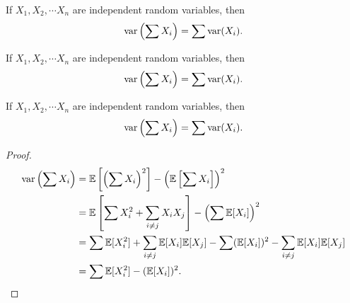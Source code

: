 \begin{note}
  \begin{field}
    \begin{thm}
      If $X_1, X_2, \cdots X_n$ are independent random variables, then
      \[
        \operatorname{var}\left(\sum X_i\right) = \sum \operatorname{var} (X_i).
      \]
    \end{thm}
  \end{field}
  \begin{field}
    \begin{thm}
      If $X_1, X_2, \cdots X_n$ are independent random variables, then
      \[
        \operatorname{var}\left(\sum X_i\right) = \sum \operatorname{var} (X_i).
      \]
    \end{thm}
  \end{field}
  \xplain{}%
\end{note}

%
\begin{note}
  \begin{field}
    \begin{thm}
      If $X_1, X_2, \cdots X_n$ are independent random variables, then
      \[
        \operatorname{var}\left(\sum X_i\right) = \sum \operatorname{var} (X_i).
      \]
    \end{thm}
  \end{field}
  \begin{field}
    \begin{proof}
      \begin{align*}
        \operatorname{var}\left(\sum X_i\right) &= \mathbb{E}\left[\left(\sum X_i\right)^2\right] - \left(\mathbb{E}\left[\sum X_i\right]\right)^2\\
        &= \mathbb{E}\left[\sum X_i^2 + \sum_{i \not =j} X_iX_j\right] - \left(\sum\mathbb{E} [X_i]\right)^2\\
        &= \sum \mathbb{E}[X_i^2] + \sum_{i\not= j}\mathbb{E}[X_i]\mathbb{E}[X_j] - \sum(\mathbb{E}[X_i])^2 - \sum_{i\not= j}\mathbb{E}[X_i]\mathbb{E}[X_j]\\
        &= \sum \mathbb{E}[X_i^2] - (\mathbb{E}[X_i])^2.\qedhere
      \end{align*}
    \end{proof}
  \end{field}
  \xplain{}%
\end{note}

